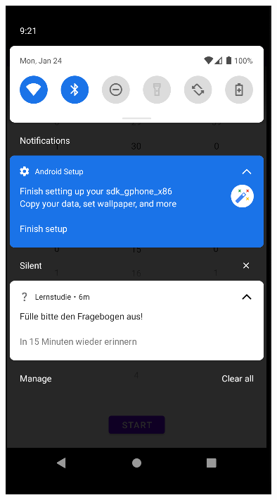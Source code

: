 \documentclass{article}
\begin{document}
\begin{center}
    \includegraphics[scale=0.5]{learn_tosurvey.png}
\end{center}



\newpage
\end{document}
